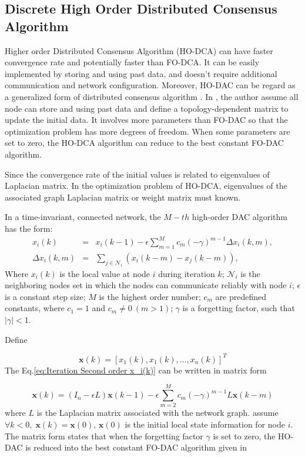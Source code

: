 \subsection{\label{sub:Discrete-High-Order}Discrete High Order Distributed Consensus
Algorithm }

Higher order Distributed Consensus Algorithm (HO-DCA) can have faster
convergence rate and potentially faster than FO-DCA. It can be easily
implemented by storing and using past data, and doesn't require additional
communication and network configuration. Moreover, HO-DAC can be regard
as a generalized form of distributed consensus algorithm \cite{Xiong2010}.
In \cite{Xiong2010}, the author assume all node can store and using
past data and define a topology-dependent matrix to update the initial
data. It involves more parameters than FO-DAC so that the optimization
problem has more degrees of freedom. When some parameters are set
to zero, the HO-DCA algorithm can reduce to the best constant FO-DAC
algorithm.

Since the convergence rate of the initial values is related to eigenvalues
of Laplacian matrix. In the optimization problem of HO-DCA, eigenvalues
of the associated graph Laplacian matrix or weight matrix must known. 

In a time-invariant, connected network, the $M-th$ high-order DAC
algorithm has the form:
\begin{eqnarray}
x_{i}(k) & = & x_{i}(k-1)-\epsilon\sum_{m=1}^{M}c_{m}(-\gamma)^{m-1}\Delta x_{i}(k,m),\label{eq:Iteration Second order x_i(k)}\\
\Delta x_{i}(k,m) & = & \sum_{j\in\mathcal{N}_{i}}\left(x_{i}\left(k-m\right)-x_{j}\left(k-m\right)\right),
\end{eqnarray}
Where $x_{i}(k)$ is the local value at node $i$ during iteration
$k$; $\mathcal{N}_{i}$ is the neighboring nodes set in which the
nodes can communicate reliably with node $i$; $\epsilon$ is a constant
step size; $M$ is the highest order number; $c_{m}$ are predefined
constants, where $c_{1}=1$ and $c_{m}\neq0\:(m>1)$; $\gamma$ is
a forgetting factor, such that $\left|\gamma\right|<1$. 

Define

\begin{equation}
\mathbf{x}(k)=\left[x_{1}(k),x_{1}(k),\ldots,x_{n}(k)\right]^{T}
\end{equation}
The Eq.\ref{eq:Iteration Second order x_i(k)} can be written in matrix
form

\begin{equation}
\mathbf{x}(k)=(I_{n}-\epsilon L)\mathbf{x}(k-1)-\epsilon\sum_{m=2}^{M}c_{m}(-\gamma)^{m-1}L\mathbf{x}(k-m)\label{eq:High Order Iter.Vec}
\end{equation}
where $L$ is the Laplacian matrix associated with the network graph.
assume $\forall k<0,\;\mathbf{x}(k)=\mathbf{x}(0)$, $\mathbf{x}(0)$
is the initial local state information for node $i$. The matrix form
states that when the forgetting factor $\gamma$ is set to zero, the
HO-DAC is reduced into the best constant FO-DAC algorithm given in 

